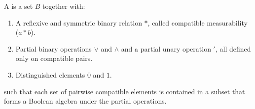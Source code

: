 A  is a set $B$ together with:
\begin{enumerate}
\item[(a)] A reflexive and symmetric binary relation $*$, called compatible measurability ($a * b$).
\item[(b)] Partial binary operations $\vee$ and $\wedge$ and a partial unary operation $'$, all defined only on compatible pairs.
\item[(c)] Distinguished elements $0$ and $1$.
\end{enumerate}
such that each set of pairwise compatible elements is contained in a subset that forms a Boolean algebra under the partial operations.
